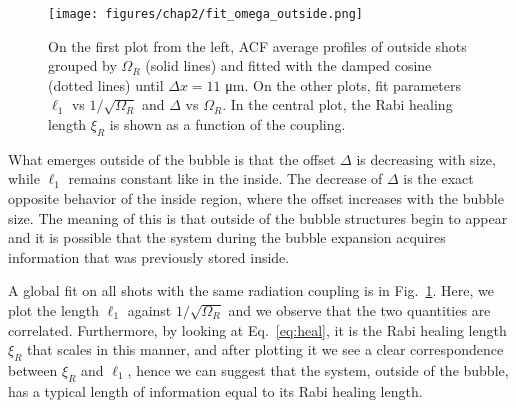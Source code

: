 \begin{figure}[ht!]
    \centering
    \texttt{[image: figures/chap2/fit\_omega\_outside.png]}
    \caption{On the first plot from the left, ACF average profiles of outside shots grouped by $\Omega_R$ (solid lines) and fitted with the damped cosine (dotted lines) until $\Delta x = 11$ \unit{\micro\meter}. On the other plots, fit parameters $\ell_1$ vs $1/\sqrt{\Omega_R}$ and $\Delta$ vs $\Omega_R$. In the central plot, the Rabi healing length $\xi_R$ is shown as a function of the coupling.}
    \label{fig:fit_omega_outside}
\end{figure}
What emerges outside of the bubble is that the offset $\Delta$ is decreasing with size, while $\ell_1$ remains constant like in the inside. The decrease of $\Delta$ is the exact opposite behavior of the inside region, where the offset increases with the bubble size. The meaning of this is that outside of the bubble structures begin to appear and it is possible that the system during the bubble expansion acquires information that was previously stored inside.

A global fit on all shots with the same radiation coupling is in Fig.\ \ref{fig:fit_omega_outside}. Here, we plot the length $\ell_1$ against $1/\sqrt{\Omega_R}$ and we observe that the two quantities are correlated. Furthermore, by looking at Eq.\ \eqref{eq:heal}, it is the Rabi healing length $\xi_R$ that scales in this manner, and after plotting it we see a clear correspondence between $\xi_R$ and $\ell_1$, hence we can suggest that the system, outside of the bubble, has a typical length of information equal to its Rabi healing length.
